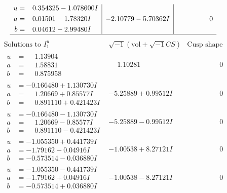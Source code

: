 \documentclass[1p]{elsarticle_modified}
\theoremstyle{definition}
\newcommand{\I}{\sqrt{-1}}
\begin{document}
$$\begin{array}{c|c|c}
\begin{aligned}
u &= \phantom{-}0.354325 - 1.078600 I \\
a &= -0.01501 - 1.78320 I \\
b &= \phantom{-}0.04612 - 2.99480 I\end{aligned}
 & -2.10779 - 5.70362 I & \phantom{-0.000000 } 0\\
 \hline 
 \end{array}$$\newpage$$\begin{array}{c|c|c}  
\text{Solutions to }I^u_{1}& \I (\text{vol} + \sqrt{-1}CS) & \text{Cusp shape}\\
 \hline 
\begin{aligned}
u &= \phantom{-}1.13904\phantom{ +0.000000I} \\
a &= \phantom{-}1.58831\phantom{ +0.000000I} \\
b &= \phantom{-}0.875958\phantom{ +0.000000I}\end{aligned}
 & \phantom{-}1.10281\phantom{ +0.000000I} & \phantom{-0.000000 } 0 \\ \hline\begin{aligned}
u &= -0.166480 + 1.130730 I \\
a &= \phantom{-}1.20669 + 0.85577 I \\
b &= \phantom{-}0.891110 + 0.421423 I\end{aligned}
 & -5.25889 + 0.99512 I & \phantom{-0.000000 } 0 \\ \hline\begin{aligned}
u &= -0.166480 - 1.130730 I \\
a &= \phantom{-}1.20669 - 0.85577 I \\
b &= \phantom{-}0.891110 - 0.421423 I\end{aligned}
 & -5.25889 - 0.99512 I & \phantom{-0.000000 } 0 \\ \hline\begin{aligned}
u &= -1.055350 + 0.441739 I \\
a &= -1.79162 - 0.04916 I \\
b &= -0.573514 - 0.036880 I\end{aligned}
 & -1.00538 + 8.27121 I & \phantom{-0.000000 } 0 \\ \hline\begin{aligned}
u &= -1.055350 - 0.441739 I \\
a &= -1.79162 + 0.04916 I \\
b &= -0.573514 + 0.036880 I\end{aligned}
 & -1.00538 - 8.27121 I & \phantom{-0.000000 } 0 \\ \hline\begin{aligned}

\end{aligned}
\end{array}$$
\end{document}
